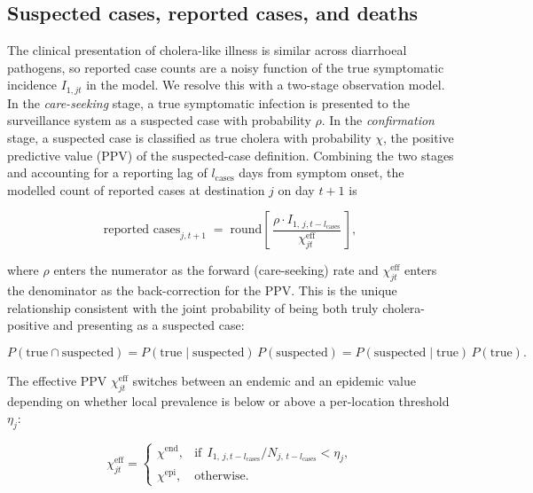 \documentclass[
]{book}
\begin{document}
\subsection{Suspected cases, reported cases, and deaths}\label{suspected-cases-reported-cases-and-deaths}

The clinical presentation of cholera-like illness is similar across diarrhoeal pathogens, so reported case counts are a noisy function of the true symptomatic incidence \(I_{1,jt}\) in the model. We resolve this with a two-stage observation model. In the \emph{care-seeking} stage, a true symptomatic infection is presented to the surveillance system as a suspected case with probability \(\rho\). In the \emph{confirmation} stage, a suspected case is classified as true cholera with probability \(\chi\), the positive predictive value (PPV) of the suspected-case definition. Combining the two stages and accounting for a reporting lag of \(l_{\text{cases}}\) days from symptom onset, the modelled count of reported cases at destination \(j\) on day \(t+1\) is

\begin{equation}
\text{reported cases}_{j,t+1} \;=\; \text{round}\!\left[\, \frac{\rho \cdot I_{1,\,j,t - l_{\text{cases}}}}{\chi_{jt}^{\text{eff}}} \,\right],
\label{eq:reported-cases}
\end{equation}

where \(\rho\) enters the numerator as the forward (care-seeking) rate and \(\chi_{jt}^{\text{eff}}\) enters the denominator as the back-correction for the PPV. This is the unique relationship consistent with the joint probability of being both truly cholera-positive and presenting as a suspected case:

\[
P(\text{true}\cap\text{suspected}) = P(\text{true}\mid\text{suspected})\,P(\text{suspected}) = P(\text{suspected}\mid\text{true})\,P(\text{true}).
\]

The effective PPV \(\chi_{jt}^{\text{eff}}\) switches between an endemic and an epidemic value depending on whether local prevalence is below or above a per-location threshold \(\eta_j\):

\begin{equation}
\chi_{jt}^{\text{eff}} =
\begin{cases}
\chi^{\text{end}}, & \text{if} \ \ I_{1,\,j,t - l_{\text{cases}}} \big/ N_{j,\,t - l_{\text{cases}}} < \eta_j,\\[3pt]
\chi^{\text{epi}}, & \text{otherwise}.
\end{cases}
\label{eq:chi-eff}
\end{equation}
\end{document}
